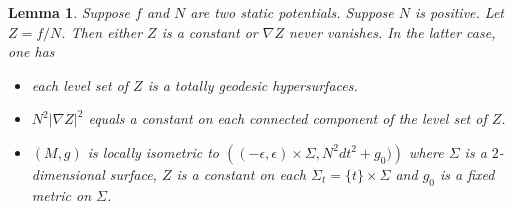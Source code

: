 \documentclass[12pt]{amsart}
\newtheorem{lma}{Lemma}[section]
\theoremstyle{remark}
\numberwithin{equation}{section}
\def\lf{\left}
\def\ri{\right}
\begin{document}
\begin{lma}\label{lma-static-quotient}
Suppose $ f$ and $N$ are two static potentials. Suppose $N$ is positive. Let  $Z=f/N$.
Then either $  Z  $ is a constant or  $\nabla Z$ never vanishes.
In the latter  case, one has
\begin{itemize}

\item[(i)]   each  level set of $Z$ is a  totally geodesic hypersurfaces.

\item[(ii)]  $ N^2 | \nabla Z |^2  $ equals a {constant}  on each connected component of the level set of $ Z$.

\item[(iii)]  $(M, g)$ is locally isometric to
$ \lf(  (-\epsilon, \epsilon) \times \Sigma, N^2 dt^2 + g_0 )  \ri) $
where $ \Sigma $ is a $2$-dimensional surface,  $ Z$ is a constant on each $ \Sigma_t = \{ t \} \times \Sigma$
and $ g_0 $ is a fixed metric on $ \Sigma$.
\end{itemize}

\end{lma}
\end{document}
